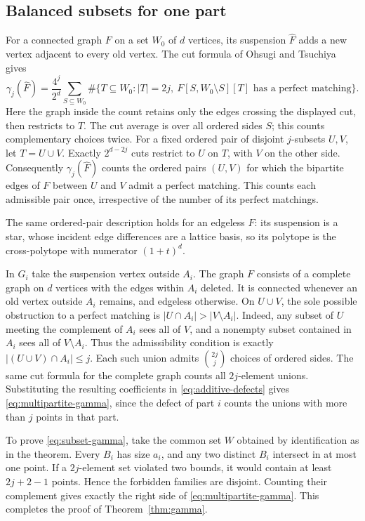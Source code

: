 \subsection{Balanced subsets for one part}
For a connected graph $F$ on a set $W_0$ of $d$ vertices, its suspension
$\widehat F$ adds a new vertex adjacent to every old vertex.
The cut formula of Ohsugi and Tsuchiya
\cite[Thm.~3.1 and Prop.~4.1]{ot} gives
\[
 \gamma_j(\widehat F)=
 \frac{4^j}{2^d}\sum_{S\subseteq W_0}
 \#\{T\subseteq W_0: |T|=2j,\ F[S,W_0\setminus S][T]
     \text{ has a perfect matching}\}.
\]
Here the graph inside the count retains only the edges crossing the
displayed cut, then restricts to $T$. The cut average is over all
ordered sides $S$; this counts complementary choices twice.
For a fixed ordered pair of disjoint $j$-subsets $U,V$, let $T=U\cup V$.
Exactly $2^{d-2j}$ cuts restrict to $U$ on $T$, with $V$ on the other
side. Consequently $\gamma_j(\widehat F)$ counts the ordered pairs
$(U,V)$ for which the bipartite edges of $F$ between $U$ and $V$ admit a
perfect matching. This counts each admissible pair once, irrespective of
the number of its perfect matchings.

The same ordered-pair description holds for an edgeless $F$: its
suspension is a star, whose incident edge differences are a lattice basis,
so its polytope is the cross-polytope with numerator $(1+t)^d$.

In $G_i$ take the suspension vertex outside $A_i$. The graph $F$ consists
of a complete graph on $d$ vertices with the edges within $A_i$ deleted. It is connected whenever an old vertex
outside $A_i$ remains, and edgeless otherwise.
On $U\cup V$, the sole possible obstruction to a perfect matching is
$|U\cap A_i|>|V\setminus A_i|$. Indeed, any subset of $U$ meeting
the complement of $A_i$ sees all of $V$, and a nonempty subset contained
in $A_i$ sees all of $V\setminus A_i$. Thus the admissibility condition
is exactly $|(U\cup V)\cap A_i|\le j$. Each such union admits
$\binom{2j}{j}$ choices of ordered sides. The same cut formula for
the complete graph counts all $2j$-element unions.
Substituting the resulting coefficients in \eqref{eq:additive-defects}
gives \eqref{eq:multipartite-gamma}, since the defect of part $i$
counts the unions with more than $j$ points in that part.

To prove \eqref{eq:subset-gamma}, take the common set $W$ obtained by
identification as in the theorem. Every $B_i$ has size $a_i$, and any two
distinct $B_i$ intersect in at most one point. If a $2j$-element set
violated two bounds, it would contain at least $2j+2-1$ points. Hence
the forbidden families are disjoint. Counting their complement gives
exactly the right side of \eqref{eq:multipartite-gamma}.
This completes the proof of Theorem~\ref{thm:gamma}.


